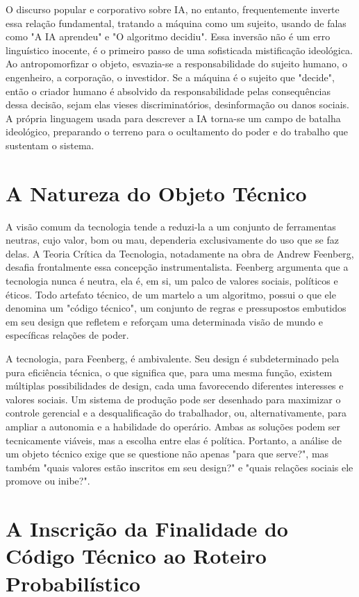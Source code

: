 O discurso popular e corporativo sobre IA, no entanto, frequentemente inverte essa relação fundamental, tratando a máquina como um sujeito, usando de falas como 
"A IA aprendeu" e "O algoritmo decidiu". Essa inversão não é um erro linguístico inocente, é o primeiro passo de uma sofisticada mistificação ideológica. Ao antropomorfizar o 
objeto, esvazia-se a responsabilidade do sujeito humano, o engenheiro, a corporação, o investidor. Se a máquina é o sujeito que "decide", então o criador humano é absolvido da 
responsabilidade pelas consequências dessa decisão, sejam elas vieses discriminatórios, desinformação ou danos sociais. A própria linguagem usada para descrever a IA torna-se 
um campo de batalha ideológico, preparando o terreno para o ocultamento do poder e do trabalho que sustentam o sistema.

\section{A Natureza do Objeto Técnico}\label{sec:natureza_obj_tec}

A visão comum da tecnologia tende a reduzi-la a um conjunto de ferramentas neutras, cujo valor, bom ou mau, dependeria exclusivamente do uso que se faz delas. A Teoria Crítica 
da Tecnologia, notadamente na obra de Andrew Feenberg, desafia frontalmente essa concepção instrumentalista. Feenberg argumenta que a tecnologia nunca é neutra, ela é, em si, 
um palco de valores sociais, políticos e éticos. Todo artefato técnico, de um martelo a um algoritmo, possui o que ele denomina um "código técnico", um conjunto de regras e 
pressupostos embutidos em seu design que refletem e reforçam uma determinada visão de mundo e específicas relações de poder.   

A tecnologia, para Feenberg, é ambivalente. Seu design é subdeterminado pela pura eficiência técnica, o que significa que, para uma mesma função, existem múltiplas possibilidades 
de design, cada uma favorecendo diferentes interesses e valores sociais. Um sistema de produção pode ser desenhado para maximizar o controle gerencial e a desqualificação do 
trabalhador, ou, alternativamente, para ampliar a autonomia e a habilidade do operário. Ambas as soluções podem ser tecnicamente viáveis, mas a escolha entre elas é política. 
Portanto, a análise de um objeto técnico exige que se questione não apenas "para que serve?", mas também "quais valores estão inscritos em seu design?" e "quais relações sociais 
ele promove ou inibe?".

\section{A Inscrição da Finalidade do Código Técnico ao Roteiro Probabilístico}\label{sec:inscricao_finalidade}

